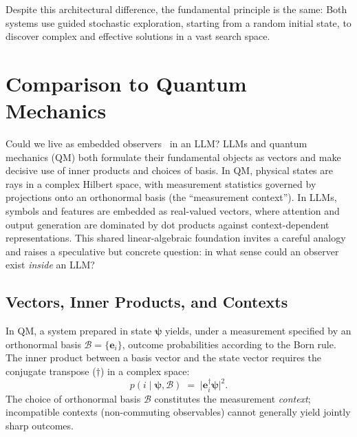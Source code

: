 \documentclass[%
  reprint,
  superscriptaddress,
  showpacs,
  showkeys,
  amsmath,amssymb,
  pra,
  longbibliography,
  floatfix,
  x11names
]{revtex4-2}
\begin{document}
Despite this architectural difference, the fundamental principle is the same:
Both systems use guided stochastic exploration, starting from a random initial state,
to discover complex and effective solutions in a vast search space.



\section{Comparison to Quantum Mechanics}
\label{section:qm}

Could we live as embedded observers~\cite{toffoli:79} in an LLM?
LLMs and quantum mechanics (QM) both formulate their fundamental objects as vectors and make decisive use of inner products and choices of basis. In QM, physical states are rays in a complex Hilbert space, with measurement statistics governed by projections onto an orthonormal basis (the ``measurement context''). In LLMs, symbols and features are embedded as real-valued vectors, where attention and output generation are dominated by dot products against context-dependent representations. This shared linear-algebraic foundation invites a careful analogy and raises a speculative but concrete question: in what sense could an observer exist \emph{inside} an LLM?

\subsection{Vectors, Inner Products, and Contexts}

In QM, a system prepared in state $\bm{\psi}$ yields, under a measurement specified by an orthonormal basis $\mathcal{B}=\{\bm{e}_i\}$, outcome probabilities according to the Born rule. The inner product between a basis vector and the state vector requires the conjugate transpose ($\dagger$) in a complex space:
\begin{equation}
    p(i \mid \bm{\psi}, \mathcal{B}) \;=\; \lvert \bm{e}_i^\dagger \bm{\psi} \rvert^{2}.
    \label{eq:born_adapted}
\end{equation}
The choice of orthonormal basis $\mathcal{B}$ constitutes the measurement \emph{context}; incompatible contexts (non-commuting observables) cannot generally yield jointly sharp outcomes.
\end{document}

